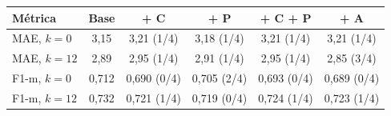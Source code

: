 \begin{tabular}{@{}lccccc@{}}
\toprule
Métrica & Base & + C & + P & + C + P & + A \\
\midrule
MAE, $k=0$ & 3,15 & 3,21 (1/4) & 3,18 (1/4) & 3,21 (1/4) & 3,21 (1/4) \\
MAE, $k=12$ & 2,89 & 2,95 (1/4) & 2,91 (1/4) & 2,95 (1/4) & 2,85 (3/4) \\
F1-m, $k=0$ & 0,712 & 0,690 (0/4) & 0,705 (2/4) & 0,693 (0/4) & 0,689 (0/4) \\
F1-m, $k=12$ & 0,732 & 0,721 (1/4) & 0,719 (0/4) & 0,724 (1/4) & 0,723 (1/4) \\
\bottomrule
\end{tabular}
